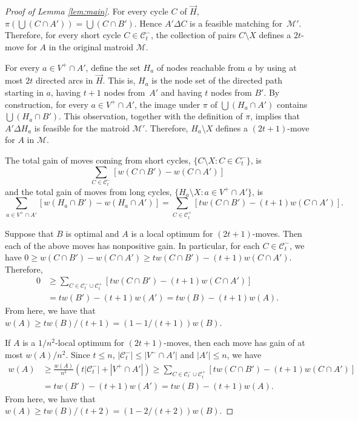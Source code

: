 \documentclass[letterpaper,11pt]{article}
\newcommand{\M}{\mathcal{M}}
\theoremstyle{definition}
\begin{document}
\begin{proof}[Proof of Lemma \ref{lem:main}]
For every cycle $C$ of $\vec{H}$, $\pi(\bigcup (C \cap A')) = \bigcup (C \cap B')$. Hence $A'\Delta C$ is a feasible matching for~$\M'$. Therefore, for every short cycle $C\in \mathcal{C}^-_t$, the collection of pairs $C\setminus X$ defines a $2t$-move for $A$ in the original matroid $\M$.

For every $a \in V^+ \cap A'$, define the set $H_a$ of nodes reachable from $a$ by using at most $2t$ directed arcs in $\vec{H}$. This is, $H_a$ is the node set of the directed path starting in $a$, having $t+1$ nodes from~$A'$ and having $t$ nodes from $B'$. By construction, for every $a\in V^+ \cap A'$, the image under $\pi$ of $\bigcup (H_a \cap A')$ contains $\bigcup (H_a \cap B')$. This observation, together with the definition of $\pi$, implies that $A' \Delta H_a$ is feasible for the matroid $\M'$. Therefore, $H_a \setminus X$ defines a $(2t+1)$-move for $A$ in $\M$.

The total gain of moves coming from short cycles, $\{C\setminus X\colon C \in C^-_t\}$, is
\begin{equation*}
  \sum_{C \in \mathcal{C}^-_t}\![w(C\cap B') - w(C\cap A')]
\end{equation*}
and the total gain of moves from long cycles, $\{H_a\setminus X\colon a \in V^+ \cap A'\}$, is
\begin{equation*}
  \sum_{a \in V^+ \cap A'}[w(H_a \cap B') - w(H_a \cap A')] = \sum_{C \in \mathcal{C}^+_t} [t w(C\cap B') - (t+1)w(C\cap A')].
\end{equation*}

Suppose that $B$ is optimal and $A$ is a local optimum for $(2t+1)$-moves. Then each of the above moves has nonpositive gain. In particular, for each $C \in \mathcal{C}^-_t$, we have $0\geq w(C\cap B') - w(C\cap A') \geq t w(C\cap B') - (t+1)w(C\cap A')$. Therefore,
\begin{align*}
0 &\geq \sum_{C \in \mathcal{C}^-_t\cup \mathcal{C}^+_t}\!\![tw(C\cap B') - (t+1)w(C\cap A')]\\
&= tw(B') -(t+1)w(A') = tw(B)-(t+1)w(A).\end{align*}
From here, we have that $w(A) \geq tw(B)/(t+1)=(1-1/(t+1))w(B)$.

If $A$ is a $1/n^2$-local optimum for $(2t+1)$-moves, then each move has gain of at most $w(A)/n^2$. Since $t\leq n$, $|\mathcal{C}^-_t|\leq |V^-\cap A'|$ and $|A'|\leq n$, we have
\begin{align*}
  w(A) &\geq \frac{w(A)}{n^2}(t|\mathcal{C}^-_t| + |V^+\cap A'|) \geq \sum_{C \in \mathcal{C}^-_t\cup \mathcal{C}^+_t}\!\![tw(C\cap B') - (t+1)w(C\cap A')]\\
&= tw(B') -(t+1)w(A') = tw(B)-(t+1)w(A).
\end{align*}
From here, we have that $w(A) \geq t w(B)/(t+2) = (1 - 2/(t+2)) w(B)$. \qedhere\end{proof}
\end{document}
